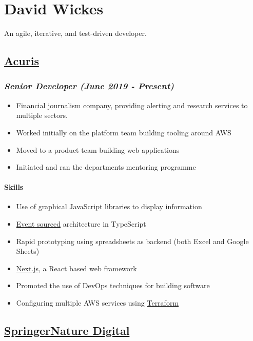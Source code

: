 \documentclass[11pt]{article}
\author{gypsydave5}
\date{\today}
\title{}
\begin{document}
\section*{David Wickes}
\label{sec:orge3cca74}
An agile, iterative, and test-driven developer.

\subsection*{\href{http://www.acuris.com/}{Acuris}}
\label{sec:org98f882b}
\subsubsection*{\emph{Senior Developer (June 2019 - Present)}}
\label{sec:org70e8da4}
\begin{itemize}
\item Financial journalism company, providing alerting and research services to multiple sectors.
\item Worked initially on the platform team building tooling around AWS
\item Moved to a product team building web applications
\item Initiated and ran the departments mentoring programme
\end{itemize}

\paragraph*{Skills}
\label{sec:org7b53b93}
\begin{itemize}
\item Use of graphical JavaScript libraries to display information
\item \href{https://martinfowler.com/eaaDev/EventSourcing.html}{Event sourced} architecture in TypeScript
\item Rapid prototyping using spreadsheets as backend (both Excel and Google Sheets)
\item \href{https://nextjs.org/}{Next.js}, a React based web framework
\item Promoted the use of DevOps techniques for building software
\item Configuring multiple AWS services using \href{https://www.terraform.io/}{Terraform}
\end{itemize}

\subsection*{\href{http://www.springernature.com}{SpringerNature Digital}}
\label{sec:org7d13deb}
\end{document}
